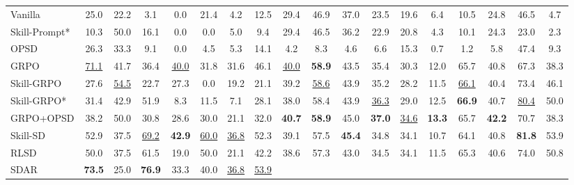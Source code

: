 \documentclass{llmxive}
\begin{document}
\begin{table}[ht!]
{\begin{tabular}{l ccccccc cccccccc cc}
    Vanilla
        & 25.0 & 22.2 & 3.1 & 0.0 & 21.4 & 4.2 & 12.5
        & 29.4 & 46.9 & 37.0 & 23.5 & 19.6 & 6.4 & 10.5 & 24.8
        & 46.5 & 4.7
        \\
    Skill-Prompt*
        & 10.3 & 50.0 & 16.1 & 0.0 & 0.0 & 5.0 & 9.4
        & 29.4 & 46.5 & 36.2 & 22.9 & 20.8 & 4.3 & 10.1 & 24.3
        & 23.0 & 2.3
        \\
    OPSD
        & 26.3 & 33.3 & 9.1 & 0.0 & 4.5 & 5.3 & 14.1
        & 4.2 & 8.3 & 4.6 & 6.6 & 15.3 & 0.7 & 1.2 & 5.8
        & 47.4 & 9.3
        \\
    GRPO
        & \cellcolor{secondcolor}\underline{71.1} & 41.7 & 36.4 & \cellcolor{secondcolor}\underline{40.0} & 31.8 & 31.6 & 46.1
        & \cellcolor{secondcolor}\underline{40.0} & \cellcolor{topcolor}\textbf{58.9} & 43.5 & 35.4 & 30.3 & 12.0 & 65.7 & 40.8
        & 67.3 & 38.3
        \\
    Skill-GRPO
        & 27.6 & \cellcolor{secondcolor}\underline{54.5} & 22.7 & 27.3 & 0.0 & 19.2 & 21.1
        & 39.2 & \cellcolor{secondcolor}\underline{58.6} & 43.9 & 35.2 & 28.2 & 11.5 & \cellcolor{secondcolor}\underline{66.1} & 40.4
        & 73.4 & 46.1
        \\
    Skill-GRPO*
        & 31.4 & 42.9 & 51.9 & 8.3 & 11.5 & 7.1 & 28.1
        & 38.0 & 58.4 & 43.9 & \cellcolor{secondcolor}\underline{36.3} & 29.0 & 12.5 & \cellcolor{topcolor}\textbf{66.9} & 40.7
        & \cellcolor{secondcolor}\underline{80.4} & 50.0
        \\
    GRPO+OPSD
        & 38.2 & 50.0 & 30.8 & 28.6 & 30.0 & 21.1 & 32.0
        & \cellcolor{topcolor}\textbf{40.7} & \cellcolor{topcolor}\textbf{58.9} & 45.0 & \cellcolor{topcolor}\textbf{37.0} & \cellcolor{secondcolor}\underline{34.6} & \cellcolor{topcolor}\textbf{13.3} & 65.7 & \cellcolor{topcolor}\textbf{42.2}
        & 70.7 & 38.3
        \\
    Skill-SD
        & 52.9 & 37.5 & \cellcolor{secondcolor}\underline{69.2} & \cellcolor{topcolor}\textbf{42.9} & \cellcolor{secondcolor}\underline{60.0} & \cellcolor{secondcolor}\underline{36.8} & 52.3
        & 39.1 & 57.5 & \cellcolor{topcolor}\textbf{45.4} & 34.8 & 34.1 & 10.7 & 64.1 & 40.8
        & \cellcolor{topcolor}\textbf{81.8} & 53.9
        \\
    RLSD
        & 50.0 & 37.5 & 61.5 & 19.0 & 50.0 & 21.1 & 42.2
        & 38.6 & 57.3 & 43.0 & 34.5 & 34.1 & 11.5 & 65.3 & 40.6
        & 74.0 & 50.8
        \\
    SDAR
        & \cellcolor{topcolor}\textbf{73.5} & 25.0 & \cellcolor{topcolor}\textbf{76.9} & 33.3 & 40.0 & \cellcolor{secondcolor}\underline{36.8} & \cellcolor{secondcolor}\underline{53.9}

\end{tabular}}
\end{table}
\end{document}
